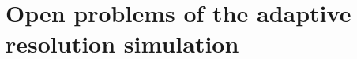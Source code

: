 \documentclass[epjST]{svjour}
\begin{document}
\section{Open problems of the adaptive resolution simulation}
\label{sec:conclusion}


{}


\end{document}

